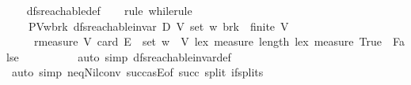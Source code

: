 \begin{isabellebody}
%
\isadelimproof
\ \ %
\endisadelimproof
%
\isatagproof
{}\isamarkupfalse%
\ dfs{\isacharunderscore}{\kern0pt}reachable{\isacharunderscore}{\kern0pt}def\isanewline
\ \ \isamarkupfalse%
\ {\isacharparenleft}{\kern0pt}rule\ while{\isacharunderscore}{\kern0pt}rule{\isacharbrackleft}{\kern0pt}\isanewline
\ \ \ \ P{\isacharequal}{\kern0pt}{\isachardoublequoteopen}{\isasymlambda}{\isacharparenleft}{\kern0pt}V{\isacharcomma}{\kern0pt}w{\isacharcomma}{\kern0pt}brk{\isacharparenright}{\kern0pt}{\isachardot}{\kern0pt}\ dfs{\isacharunderscore}{\kern0pt}reachable{\isacharunderscore}{\kern0pt}invar\ D\ V\ {\isacharparenleft}{\kern0pt}set\ w{\isacharparenright}{\kern0pt}\ brk\ {\isasymand}\ finite\ V{\isachardoublequoteclose}\isanewline
\ \ \ \ \ r{\isacharequal}{\kern0pt}{\isachardoublequoteopen}measure\ {\isacharparenleft}{\kern0pt}{\isasymlambda}V{\isachardot}{\kern0pt}\ card\ {\isacharparenleft}{\kern0pt}E\isactrlsup {\isacharasterisk}{\kern0pt}\ {\isacharbackquote}{\kern0pt}{\isacharbackquote}{\kern0pt}\ {\isacharparenleft}{\kern0pt}set\ w\ {\isacharminus}{\kern0pt}\ V{\isacharparenright}{\kern0pt}{\isacharparenright}{\kern0pt}\ {\isacharless}{\kern0pt}{\isacharasterisk}{\kern0pt}lex{\isacharasterisk}{\kern0pt}{\isachargreater}{\kern0pt}\ measure\ length\ {\isacharless}{\kern0pt}{\isacharasterisk}{\kern0pt}lex{\isacharasterisk}{\kern0pt}{\isachargreater}{\kern0pt}\ measure\ {\isacharparenleft}{\kern0pt}{\isasymlambda}True{\isasymRightarrow}{}\ {\isacharbar}{\kern0pt}\ False{\isasymRightarrow}{}{\isacharparenright}{\kern0pt}{\isachardoublequoteclose}\isanewline
\ \ \ \ {\isacharbrackright}{\kern0pt}{\isacharparenright}{\kern0pt}\isanewline
\ \ \isamarkupfalse%
\ \isamarkupfalse%
\ {\isacharparenleft}{\kern0pt}auto\ simp{\isacharcolon}{\kern0pt}\ dfs{\isacharunderscore}{\kern0pt}reachable{\isacharunderscore}{\kern0pt}invar{\isacharunderscore}{\kern0pt}def{\isacharparenright}{\kern0pt}\isanewline
\ \ \isamarkupfalse%
\isanewline
\ \ \ \ \isamarkupfalse%
\ {\isacharparenleft}{\kern0pt}auto\ simp{\isacharcolon}{\kern0pt}\ neq{\isacharunderscore}{\kern0pt}Nil{\isacharunderscore}{\kern0pt}conv\ succ{\isacharunderscore}{\kern0pt}as{\isacharunderscore}{\kern0pt}E{\isacharbrackleft}{\kern0pt}of\ succ{\isacharbrackright}{\kern0pt}\ split{\isacharcolon}{\kern0pt}\ if{\isacharunderscore}{\kern0pt}splits{\isacharparenright}{\kern0pt}\isanewline

\end{isabellebody}
